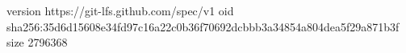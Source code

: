 version https://git-lfs.github.com/spec/v1
oid sha256:35d6d15608e34fd97c16a22c0b36f70692dcbbb3a34854a804dea5f29a871b3f
size 2796368
